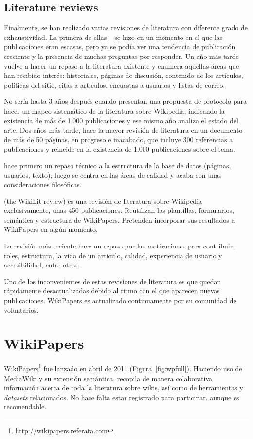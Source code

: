 \documentclass[11pt,twocolumn]{article}
\begin{document}
\subsection{Literature reviews}
Finalmente, se han realizado varias revisiones de literatura con diferente grado de exhaustividad. La primera de ellas ~\citep{voss2005} se hizo en un momento en el que las publicaciones eran escasas, pero ya se podía ver una tendencia de publicación creciente y la presencia de muchas preguntas por responder. Un año más tarde ~\citep{ayers2006} vuelve a hacer un repaso a la literatura existente y enumera aquellas áreas que han recibido interés: historiales, páginas de discusión, contenido de los artículos, políticas del sitio, citas a artículos, encuestas a usuarios y listas de correo.

No sería hasta 3 años después cuando \cite{okoli2009b} presentan una propuesta de protocolo para hacer un mapeo sistemático de la literatura sobre Wikipedia, indicando la existencia de más de 1.000 publicaciones y ese mismo año \cite{okoli2009} analiza el estado del arte. Dos años más tarde, \cite{nielsen2011} hace la mayor revisión de literatura en un documento de más de 50 páginas, en progreso e inacabado, que incluye 300 referencias a publicaciones y reincide en la existencia de 1.000 publicaciones sobre el tema.

\cite{martin2011} hace primero un repaso técnico a la estructura de la base de datos (páginas, usuarios, texto), luego se centra en las áreas de calidad y acaba con unas consideraciones filosóficas.

\cite{okoli2012} (the WikiLit review) es una revisión de literatura sobre Wikipedia exclusivamente, unas 450 publicaciones. Reutilizan las plantillas, formularios, semántica y estructura de WikiPapers. Pretenden incorporar sus resultados a WikiPapers en algún momento.

La revisión más reciente \cite{jullien2012} hace un repaso por las motivaciones para contribuir, roles, estructura, la vida de un artículo, calidad, experiencia de usuario y accesibilidad, entre otros.

Uno de los inconvenientes de estas revisiones de literatura es que quedan rápidamente desactualizadas debido al ritmo con el que aparecen nuevas publicaciones. WikiPapers es actualizado continuamente por su comunidad de voluntarios.

\section{WikiPapers}
WikiPapers\footnote{\href{http://wikipapers.referata.com}{http://wikipapers.referata.com}} fue lanzado en abril de 2011 (Figura~\ref{fig:wpfull}). Haciendo uso de MediaWiki y su extensión semántica, recopila de manera colaborativa información acerca de toda la literatura sobre wikis, así como de herramientas y \emph{datasets} relacionados. No hace falta estar registrado para participar, aunque es recomendable.
\end{document}
